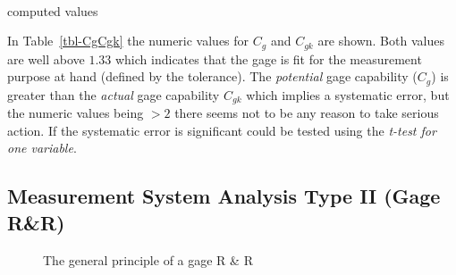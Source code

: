 \documentclass[
  a4paper,
]{scrbook}
\makeatletter
\let\oldparagraph\paragraph
\renewcommand{\paragraph}{
    \@ifstar
      \xxxParagraphStar
      \xxxParagraphNoStar
  }
\newcommand{\xxxParagraphStar}[1]{\oldparagraph*{#1}\mbox{}}
\newcommand{\xxxParagraphNoStar}[1]{\oldparagraph{#1}\mbox{}}
\makeatother
\begin{document}
\paragraph{computed values}\label{computed-values}

\begin{table}

\caption{\label{tbl-CgCgk}\(C_g, C_{gk}\) for the measured values}


\end{table}%

In Table~\ref{tbl-CgCgk} the numeric values for \(C_g\) and \(C_{gk}\)
are shown. Both values are well above \(1.33\) which indicates that the
gage is fit for the measurement purpose at hand (defined by the
tolerance). The \emph{potential} gage capability (\(C_g\)) is greater
than the \emph{actual} gage capability \(C_{gk}\) which implies a
systematic error, but the numeric values being \(>2\) there seems not to
be any reason to take serious action. If the systematic error is
significant could be tested using the \emph{t-test for one variable}.

\newpage{}

\subsection{Measurement System Analysis Type II (Gage
R\&R)}\label{measurement-system-analysis-type-ii-gage-rr}

\begin{figure}[ht]


\caption{\label{fig-gagerr-raw}The general principle of a gage R \& R}

\end{figure}%
\end{document}
